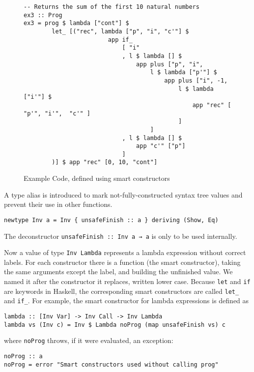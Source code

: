 \documentclass[a4paper,halfparskip,DIV=10,11pt]{scrbook}
\begin{document}
\begin{figure}
\begin{framed}
\centering
\begin{lstlisting}
-- Returns the sum of the first 10 natural numbers            
ex3 :: Prog
ex3 = prog $ lambda ["cont"] $
        let_ [("rec", lambda ["p", "i", "c'"] $
                        app if_
                            [ "i"
                            , l $ lambda [] $
                                app plus ["p", "i",
                                    l $ lambda ["p'"] $
                                        app plus ["i", -1,
                                            l $ lambda ["i'"] $
                                                app "rec" [ "p'", "i'",  "c'" ]
                                            ]
                                    ]
                            , l $ lambda [] $
                                app "c'" ["p"]
                            ]
        )] $ app "rec" [0, 10, "cont"]
\end{lstlisting}
\end{framed}
\caption{Example Code, defined using smart constructors}
\label{fig:sum10}
\end{figure}

A type alias is introduced to mark not-fully-constructed syntax tree values and prevent their use in other functions.
\begin{lstlisting}
newtype Inv a = Inv { unsafeFinish :: a } deriving (Show, Eq)
\end{lstlisting}
The deconstructor \lstinline!unsafeFinish :: Inv a → a! is only to be used internally.

Now a value of type \lstinline-Inv Lambda- represents a lambda expression without correct labels. For each constructor there is a function (the smart constructor), taking the same arguments except the label, and building the unfinished value. We named it after the constructor it replaces, written lower case. Because \lstinline-let- and \lstinline-if- are keywords in Haskell, the corresponding smart constructors are called \lstinline-let_- and \lstinline-if_-. For example, the smart constructor for lambda expressions is defined as
\begin{lstlisting}
lambda :: [Inv Var] -> Inv Call -> Inv Lambda
lambda vs (Inv c) = Inv $ Lambda noProg (map unsafeFinish vs) c
\end{lstlisting}
where \lstinline!noProg! throws, if it were evaluated, an exception:
\begin{lstlisting}
noProg :: a
noProg = error "Smart constructors used without calling prog"
\end{lstlisting}
\end{document}
